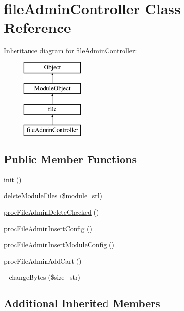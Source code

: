\hypertarget{classfileAdminController}{\section{file\+Admin\+Controller Class Reference}
\label{classfileAdminController}
}
Inheritance diagram for file\+Admin\+Controller\+:\begin{figure}[H]
\begin{center}
\leavevmode
\includegraphics[height=4.000000cm]{classfileAdminController}
\end{center}
\end{figure}
\subsection*{Public Member Functions}
\begin{DoxyCompactItemize}
\item 
\hyperlink{classfileAdminController_a7926db5aa01c3f22d73c746dfc10c318}{init} ()
\item 
\hyperlink{classfileAdminController_aaa637d3e043a4be10292fa2514c4f0f3}{delete\+Module\+Files} (\$\hyperlink{ko_8install_8php_a370bb6450fab1da3e0ed9f484a38b761}{module\+\_\+srl})
\item 
\hyperlink{classfileAdminController_a0f3042e741a71e3223ea0c9af2d224a4}{proc\+File\+Admin\+Delete\+Checked} ()
\item 
\hyperlink{classfileAdminController_a03889846de03ed7142320ef12aed5eda}{proc\+File\+Admin\+Insert\+Config} ()
\item 
\hyperlink{classfileAdminController_af0fc824e9379d6c2fdd55c7b7444c317}{proc\+File\+Admin\+Insert\+Module\+Config} ()
\item 
\hyperlink{classfileAdminController_a9ba55f911e0f616159687149b0b37fc3}{proc\+File\+Admin\+Add\+Cart} ()
\item 
\hyperlink{classfileAdminController_a2b92b91c0bda79fc26a56f67bae97ede}{\+\_\+change\+Bytes} (\$size\+\_\+str)
\end{DoxyCompactItemize}
\subsection*{Additional Inherited Members}


